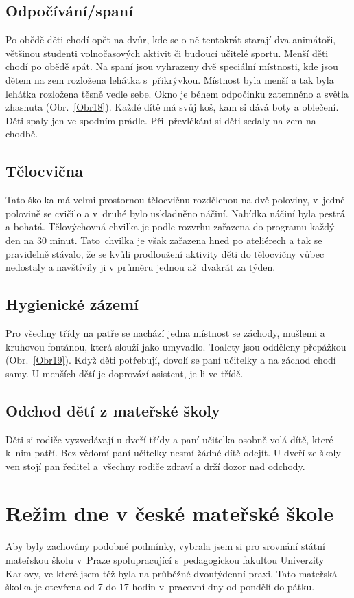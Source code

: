 		\subsection{Odpočívání/spaní}
		\label{spani}
			Po obědě děti chodí opět na dvůr, kde se o ně tentokrát starají dva animátoři, většinou studenti volnočasových aktivit či budoucí učitelé sportu.
			Menší děti chodí po obědě spát. Na spaní jsou vyhrazeny dvě speciální místnosti, kde jsou dětem na zem rozložena lehátka s přikrývkou. Místnost byla menší a tak byla lehátka rozložena těsně vedle sebe. Okno je během odpočinku zatemněno a světla zhasnuta (Obr.~\ref{Obr18}).
			Každé dítě má svůj koš, kam si dává boty a oblečení. Děti spaly jen ve spodním prádle. Při převlékání si děti sedaly na zem na chodbě. 

		\subsection{Tělocvična}
			Tato školka má velmi prostornou tělocvičnu rozdělenou na dvě poloviny, v jedné polovině se cvičilo a v druhé bylo uskladněno náčiní. Nabídka náčiní byla pestrá a bohatá. Tělovýchovná chvilka je podle rozvrhu zařazena do programu každý den na 30 minut. Tato chvilka je však zařazena hned po ateliérech a tak se pravidelně stávalo, že se kvůli prodloužení aktivity děti do tělocvičny vůbec nedostaly a navštívily ji v průměru jednou až dvakrát za týden. 

		\subsection{Hygienické zázemí}
		\label{zachody}
			Pro všechny třídy na patře se nachází jedna místnost se záchody, mušlemi a kruhovou fontánou, která slouží jako umyvadlo. Toalety jsou odděleny přepážkou (Obr.~\ref{Obr19}). Když děti potřebují, dovolí se paní učitelky a na záchod chodí samy. U menších dětí je doprovází asistent, je-li ve třídě. 
		

		\subsection{Odchod dětí z mateřské školy}
			Děti si rodiče vyzvedávají u dveří třídy a paní učitelka osobně volá dítě, které k nim patří. Bez vědomí paní učitelky nesmí žádné dítě odejít. U dveří ze školy ven stojí pan ředitel a všechny rodiče zdraví a drží dozor nad odchody. 

	\section{Režim dne v české mateřské škole}
		Aby byly zachovány podobné podmínky, vybrala jsem si pro srovnání státní mateřskou školu v Praze spolupracující s pedagogickou fakultou Univerzity Karlovy, ve které jsem též byla na průběžné dvoutýdenní praxi. Tato mateřská školka je otevřena od 7 do 17 hodin v pracovní dny od pondělí do pátku.

